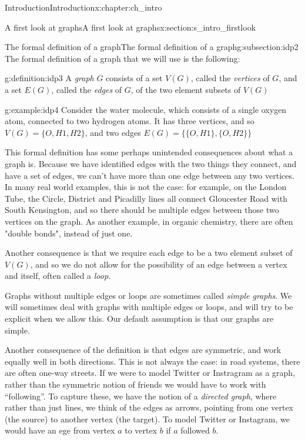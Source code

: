 \documentclass[oneside,10pt,]{book}
\numberwithin{equation}{section}
\begin{document}
\begin{chapterptx}{Introduction}{}{Introduction}{}{}{x:chapter:ch_intro}
\begin{sectionptx}{A first look at graphs}{}{A first look at graphs}{}{}{x:section:s_intro_firstlook}
\typeout{************************************************}
%
\begin{subsectionptx}{The formal definition of a graph}{}{The formal definition of a graph}{}{}{g:subsection:idp2}
The formal definition of a graph that we will use is the following:%
\begin{definition}{}{g:definition:idp3}%
A \emph{graph} \(G\) consists of a set \(V(G)\), called the \emph{vertices} of \(G\), and a set \(E(G)\), called the \emph{edges} of \(G\), of the two element subsets of \(V(G)\)%
\end{definition}
\begin{example}{}{g:example:idp4}%
Consider the water molecule, which consists of a single oxygen atom, connected to two hydrogen atoms.  It has three vertices, and so \(V(G)=\{O, H1, H2\}\), and two edges \(E(G)=\big\{\{O, H1\},\{O,H2\}\big\}\)%
\end{example}
This formal definition has some perhaps unintended consequences about what a graph is.  Because we have identified edges with the two things they connect, and have a set of edges, we can't have more than one edge between any two vertices.  In many real world examples, this is not the case: for example, on the London Tube, the Circle, District and Picadilly lines all connect Gloucester Road with South Kensington, and so there should be multiple edges between those two vertices on the graph.  As another example, in organic chemistry, there are often "double bonds", instead of just one.%
\par
Another consequence is that we require each edge to be a two element subset of \(V(G)\), and so we do not allow for the possibility of an edge between a vertex and itself, often called a \emph{loop}.%
\par
Graphs without multiple edges or loops are sometimes called \emph{simple graphs}.  We will sometimes deal with graphs with multiple edges or loops, and will try to be explicit when we allow this.  Our default assumption is that our graphs are simple.%
\par
Another consequence of the definition is that edges are symmetric, and work equally well in both directions.  This is not always the case: in road systems, there are often one-way streets.  If we were to model Twitter or Instragram as a graph, rather than the symmetric notion of friends we would have to work with ``following''.  To capture these, we have the notion of a \emph{directed graph}, where rather than just lines, we think of the edges as arrows, pointing from one vertex (the source) to another vertex (the target).  To model Twitter or Instagram, we would have an ege from vertex \(a\) to vertex \(b\) if \(a\) followed \(b\).%

\end{subsectionptx}
\end{sectionptx}
\end{chapterptx}
\end{document}
